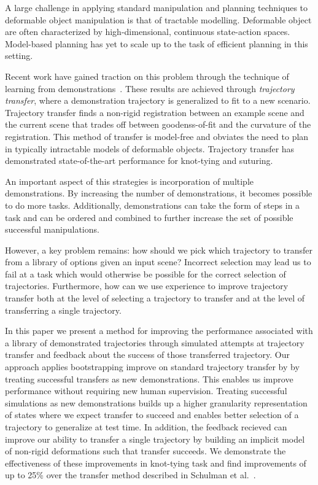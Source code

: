 A large challenge in applying standard manipulation and planning techniques to
deformable object manipulation is that of tractable modelling. Deformable object 
are often characterized by high-dimensional, continuous state-action spaces. Model-based 
planning has yet to scale up to the task of efficient planning in this
setting.

Recent work have gained traction on this problem through the technique of 
learning from demonstrations~\cite{Schulmanetal_ISRR2013,Schulmanetal_IROS2013}.
These results are achieved through \emph{trajectory transfer}, where a demonstration
trajectory is generalized to fit to a new scenario. Trajectory transfer finds a non-rigid
registration between an example scene and the current scene that trades off between
goodenss-of-fit and the curvature of the registration. 
This method of transfer is model-free and obviates the need to plan in typically
intractable models of deformable objects. Trajectory transfer has demonstrated 
state-of-the-art performance for knot-tying and suturing.

An important aspect of this strategies is incorporation of multiple demonstrations. 
By increasing the number of demonstrations, it becomes possible to do more
tasks. Additionally, demonstrations can take the form of steps in a task and can be
ordered and combined to further increase the set of possible successful manipulations.

However, a key problem remains: how should we pick which trajectory to transfer
from a library of options given an input scene? Incorrect selection may lead us
to fail at a task which would otherwise be possible for the correct selection of 
trajectories. Furthermore, how can we use experience to improve trajectory transfer 
both at the level of selecting a trajectory to transfer and at the level of transferring
a single trajectory.

In this paper we present a method for improving the performance associated with
a library of demonstrated trajectories through simulated attempts at trajectory
transfer and feedback about the success of those transferred trajectory. Our approach
applies bootstrapping improve on standard trajectory transfer by 
by treating successful transfers as new demonstrations. This enables us improve
performance without requiring new human supervision. Treating successful simulations
as new demonstrations builds up a higher granularity representation of states where
we expect transfer to succeed and enables better selection of a trajectory to 
generalize at test time. In addition, the feedback recieved can improve our ability
to transfer a single trajectory by building an implicit model of non-rigid 
deformations such that transfer succeeds. We demonstrate the effectiveness 
of these improvements in knot-tying task and find improvements  
of up to 25\% over the transfer method described in Schulman et al.~\cite{Schulmanetal_ISRR2013}.


